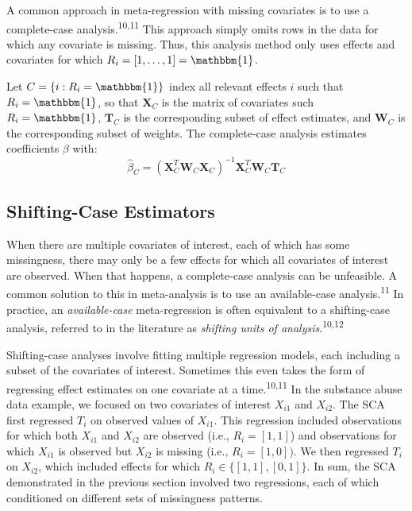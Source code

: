 \documentclass[
]{article}
\begin{document}
A common approach in meta-regression with missing covariates is to use a complete-case analysis.\textsuperscript{10,11}
This approach simply omits rows in the data for which any covariate is missing.
Thus, this analysis method only uses effects and covariates for which \(R_i = [1, \ldots, 1] = \mathbbm{1}\).

Let \(C = \{i : R_i = \mathbbm{1}\}\) index all relevant effects \(i\) such that \(R_i = \mathbbm{1}\), so that \(\mathbf{X}_C\) is the matrix of covariates such \(R_i = \mathbbm{1}\), \(\mathbf{T}_C\) is the corresponding subset of effect estimates, and \(\mathbf{W}_C\) is the corresponding subset of weights.
The complete-case analysis estimates coefficients \(\beta\) with:
\begin{equation}
\hat{\beta}_C
  = (\mathbf{X}_C^T \mathbf{W}_C \mathbf{X}_C)^{-1} \mathbf{X}_C^T \mathbf{W}_C \mathbf{T}_C
\label{eq:beta-c}
\end{equation}

\hypertarget{shifting-case-estimators}{%
\subsection{Shifting-Case Estimators}\label{shifting-case-estimators}}

When there are multiple covariates of interest, each of which has some missingness, there may only be a few effects for which all covariates of interest are observed.
When that happens, a complete-case analysis can be unfeasible.
A common solution to this in meta-analysis is to use an available-case analysis.\textsuperscript{11}
In practice, an \emph{available-case} meta-regression is often equivalent to a shifting-case analysis, referred to in the literature as \emph{shifting units of analysis}.\textsuperscript{10,12}

Shifting-case analyses involve fitting multiple regression models, each including a subset of the covariates of interest.
Sometimes this even takes the form of regressing effect estimates on one covariate at a time.\textsuperscript{10,11}
In the substance abuse data example, we focused on two covariates of interest \(X_{i1}\) and \(X_{i2}\).
The SCA first regressed \(T_i\) on observed values of \(X_{i1}\).
This regression included observations for which both \(X_{i1}\) and \(X_{i2}\) are observed (i.e., \(R_i = [1, 1]\)) and observations for which \(X_{i1}\) is observed but \(X_{i2}\) is missing (i.e., \(R_i = [1, 0])\).
We then regressed \(T_i\) on \(X_{i2}\), which included effects for which \(R_i \in \{[1, 1], [0, 1]\}\).
In sum, the SCA demonstrated in the previous section involved two regressions, each of which conditioned on different sets of missingness patterns.
\end{document}
